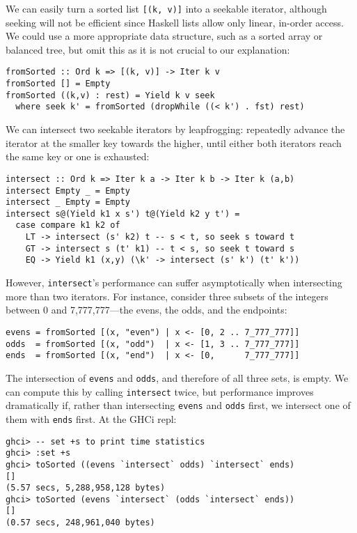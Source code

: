 \documentclass[acmsmall,screen,dvipsnames,svgnames]{acmart}
\newcommand\hask[1]{\texttt{#1}}
\newcommand\ttt\texttt
\begin{document}
\noindent
We can easily turn a sorted list \hask{[(k, v)]} into a seekable iterator, although seeking will not be efficient since Haskell lists allow only linear, in-order access.
We could use a more appropriate data structure, such as a sorted array or balanced tree, but omit this as it is not crucial to our explanation:

\begin{verbatim}
fromSorted :: Ord k => [(k, v)] -> Iter k v
fromSorted [] = Empty
fromSorted ((k,v) : rest) = Yield k v seek
  where seek k' = fromSorted (dropWhile ((< k') . fst) rest)
\end{verbatim}

\noindent
We can intersect two seekable iterators by leapfrogging: repeatedly advance the iterator at the smaller key towards the higher, until either both iterators reach the same key or one is exhausted:

\begin{verbatim}
intersect :: Ord k => Iter k a -> Iter k b -> Iter k (a,b)
intersect Empty _ = Empty
intersect _ Empty = Empty
intersect s@(Yield k1 x s') t@(Yield k2 y t') =
  case compare k1 k2 of
    LT -> intersect (s' k2) t -- s < t, so seek s toward t
    GT -> intersect s (t' k1) -- t < s, so seek t toward s
    EQ -> Yield k1 (x,y) (\k' -> intersect (s' k') (t' k'))
\end{verbatim}

\noindent
However, \ttt{intersect}'s performance can suffer asymptotically when intersecting more than two iterators.
For instance, consider three subsets of the integers between 0 and 7,777,777---the evens, the odds, and the endpoints:

\begin{verbatim}
evens = fromSorted [(x, "even") | x <- [0, 2 .. 7_777_777]]
odds  = fromSorted [(x, "odd")  | x <- [1, 3 .. 7_777_777]]
ends  = fromSorted [(x, "end")  | x <- [0,      7_777_777]]
\end{verbatim}

\noindent
The intersection of \ttt{evens} and \ttt{odds}, and therefore of all three sets, is empty.
We can compute this by calling \ttt{intersect} twice, but performance improves dramatically if, rather than intersecting \ttt{evens} and \ttt{odds} first, we intersect one of them with \ttt{ends} first.
At the GHCi repl:

\begin{verbatim}
ghci> -- set +s to print time statistics
ghci> :set +s
ghci> toSorted ((evens `intersect` odds) `intersect` ends)
[]
(5.57 secs, 5,288,958,128 bytes)
ghci> toSorted (evens `intersect` (odds `intersect` ends))
[]
(0.57 secs, 248,961,040 bytes)
\end{verbatim}
\end{document}
